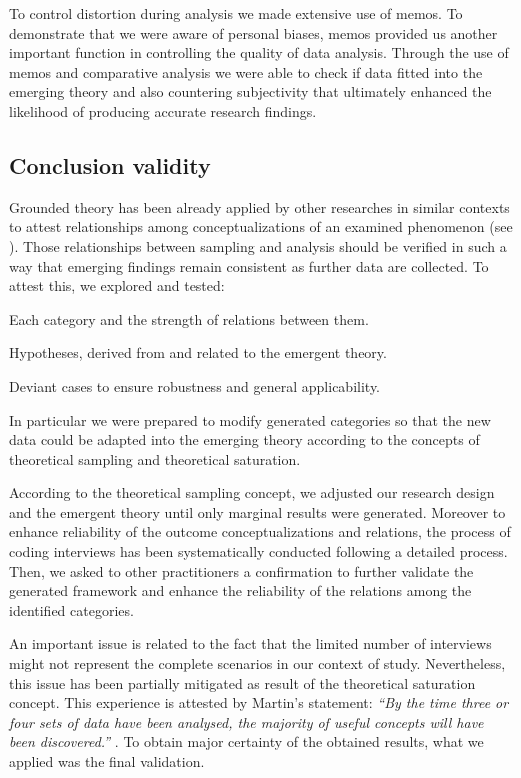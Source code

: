 \documentclass[10pt,journal,letterpaper,compsoc]{IEEEtran}
\begin{document}
To control distortion during analysis we made extensive use of memos. To 
demonstrate that we were aware of personal biases, memos provided us another 
important function in controlling the quality of data analysis. Through the use 
of memos and comparative analysis we were able to check if data fitted into the 
emerging theory and also countering subjectivity that ultimately enhanced the 
likelihood of producing accurate research findings.

\subsection{Conclusion validity}

Grounded theory has been already applied by other researches in similar 
contexts to attest relationships among conceptualizations of an examined 
phenomenon (see \cite{Coleman2007, Basri, Coleman2008a}). Those relationships 
between sampling and analysis should be verified in such a way that emerging 
findings remain consistent as further data are collected. To attest this, we  
explored and tested:

\begin{compactitem}
\item Each category and the strength of relations between them.
\item Hypotheses, derived from and related to the emergent theory.
\item Deviant cases to ensure robustness and general applicability.
\end{compactitem}

In particular we were prepared to modify generated categories so that the new 
data could be adapted into the emerging theory according to the concepts of 
theoretical sampling and theoretical saturation.

According to the theoretical sampling concept, we adjusted our 
research design and the emergent theory until only marginal results were 
generated. Moreover to enhance reliability of the outcome conceptualizations and 
relations, the process of coding interviews has been systematically conducted 
following a detailed process. Then, we asked to other practitioners a 
confirmation to further validate the generated framework and enhance the 
reliability of the relations among the identified categories.

An important issue is related to the fact that the limited number of interviews 
might not represent the complete scenarios in our context of study. 
Nevertheless, this issue has been partially mitigated as result of the 
theoretical saturation concept. This experience is attested by Martin's 
statement: \textit{``By the time three or four sets of data have been analysed, 
the majority of useful concepts will have been discovered.''} 
\cite{giardinoEtAl}. To obtain major certainty of the obtained results, what we 
applied was the final validation.
\end{document}
